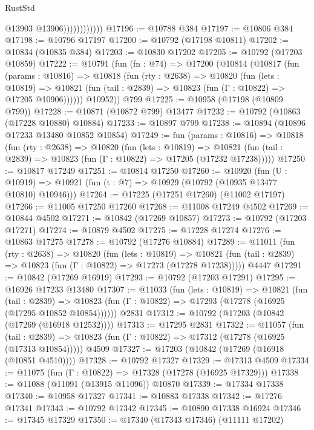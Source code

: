 \begin{lexlean}{RustStd}
\begin{coremodule}
                            @13903
                            @13906))))))))))))
@17196 := @10788 @384
@17197 := @10806 @384
@17198 := @10796 @17197
@17200 := @10792 (@17198 @10811)
@17202 := @10834 (@10835 @384)
@17203 := @10830 @17202
@17205 := @10792 (@17203 @10859)
@17222 := @10791
    (fun (fn : @74) =>
    @17200
      (@10814
        (@10817
          (fun (params : @10816) =>
          @10818
            (fun (rty : @2638) =>
            @10820
              (fun (lets : @10819) =>
              @10821 (fun (tail : @2839) => @10823 (fun (Γ : @10822) => @17205 @10906))))))
        @10952))
    @799
@17225 := @10958 (@17198 (@10809 @799))
@17228 := @10871 (@10872 @799) @13477
@17232 := @10792 (@10863 (@17228 @10880) @10884)
@17233 := @10897 @799
@17238 := @10894 (@10896 @17233 @13480 @10852 @10854)
@17249 := fun (params : @10816) =>
  @10818
    (fun (rty : @2638) =>
    @10820
      (fun (lets : @10819) =>
      @10821 (fun (tail : @2839) => @10823 (fun (Γ : @10822) => @17205 (@17232 @17238)))))
@17250 := @10817 @17249
@17251 := @10814 @17250
@17260 := @10920
    (fun (U : @10919) => @10921 (fun (t : @7) => @10929 (@10792 (@10935 @13477 @10810) @10946)))
@17264 := @17225 (@17251 @17260) (@11002 @17197)
@17266 := @11005 @17250 @17260
@17268 := @11008 @17249 @4502
@17269 := @10844 @4502
@17271 := @10842 (@17269 @10857)
@17273 := @10792 (@17203 @17271)
@17274 := @10879 @4502
@17275 := @17228 @17274
@17276 := @10863 @17275
@17278 := @10792 (@17276 @10884)
@17289 := @11011
    (fun (rty : @2638) =>
    @10820
      (fun (lets : @10819) =>
      @10821 (fun (tail : @2839) => @10823 (fun (Γ : @10822) => @17273 (@17278 @17238)))))
    @4447
@17291 := @10842 (@17269 @16919)
@17293 := @10792 (@17203 @17291)
@17295 := @16926 @17233 @13480
@17307 := @11033
    (fun (lets : @10819) =>
    @10821
      (fun (tail : @2839) =>
      @10823 (fun (Γ : @10822) => @17293 (@17278 (@16925 (@17295 @10852 @10854))))))
    @2831
@17312 := @10792 (@17203 (@10842 (@17269 (@16918 @12532))))
@17313 := @17295 @2831
@17322 := @11057
    (fun (tail : @2839) => @10823 (fun (Γ : @10822) => @17312 (@17278 (@16925 (@17313 @10854)))))
    @4509
@17327 := @17203 (@10842 (@17269 (@16918 (@10851 @4510))))
@17328 := @10792 @17327
@17329 := @17313 @4509
@17334 := @11075 (fun (Γ : @10822) => @17328 (@17278 (@16925 @17329)))
@17338 := @11088 (@11091 (@13915 @11096)) @10870
@17339 := @17334 @17338
@17340 := @10958 @17327
@17341 := @10883 @17338
@17342 := @17276 @17341
@17343 := @10792 @17342
@17345 := @10890 @17338 @16924
@17346 := @17345 @17329
@17350 := @17340 (@17343 @17346) (@11111 @17202)

\end{coremodule}
\end{lexlean}

